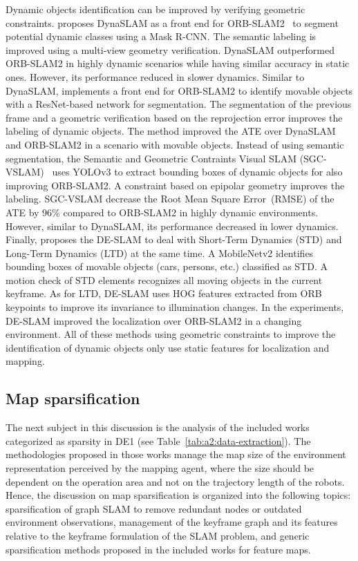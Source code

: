Dynamic objects identification can be improved by verifying geometric constraints.
\cite{bescos-et-al:2018:2860039} proposes DynaSLAM as a front end for ORB-SLAM2~\parencite{discussion:orb-slam2} to segment potential dynamic classes using a Mask R-CNN. The semantic labeling is improved using a multi-view geometry verification. DynaSLAM outperformed ORB-SLAM2 in highly dynamic scenarios while having similar accuracy in static ones. However, its performance reduced in slower dynamics.
Similar to DynaSLAM, \cite{wang-et-al:2019:8793499} implements a front end for ORB-SLAM2 to identify movable objects with a ResNet-based network for segmentation. The segmentation of the previous frame and a geometric verification based on the reprojection error improves the labeling of dynamic objects. The method improved the ATE over DynaSLAM and ORB-SLAM2 in a scenario with movable objects.
Instead of using semantic segmentation, the Semantic and Geometric Contraints Visual SLAM (SGC-VSLAM)~\parencite{yang-et-al:2020:s20082432} uses YOLOv3 to extract bounding boxes of dynamic objects for also improving ORB-SLAM2. A constraint based on epipolar geometry improves the labeling. SGC-VSLAM decrease the Root Mean Square Error~(RMSE) of the ATE by 96\% compared to ORB-SLAM2 in highly dynamic environments. However, similar to DynaSLAM, its performance decreased in lower dynamics.
Finally, \cite{xing-et-al:2022:22062} proposes the DE-SLAM to deal with Short-Term Dynamics (STD) and Long-Term Dynamics (LTD) at the same time. A MobileNetv2 identifies bounding boxes of movable objects (cars, persons, etc.) classified as STD. A motion check of STD elements recognizes all moving objects in the current keyframe. As for LTD, DE-SLAM uses HOG features extracted from ORB keypoints to improve its invariance to illumination changes. In the experiments, DE-SLAM improved the localization over ORB-SLAM2 in a changing environment.
All of these methods using geometric constraints to improve the identification of dynamic objects only use static features for localization and mapping.





\subsection{Map sparsification}
\label{sec:discussion:sparsity}

The next subject in this discussion is the analysis of the included works categorized as sparsity in DE1 (see Table~\ref{tab:a2:data-extraction}). The methodologies proposed in those works manage the map size of the environment representation perceived by the mapping agent, where the size should be dependent on the operation area and not on the trajectory length of the robots.
Hence, the discussion on map sparsification is organized into the following topics: sparsification of graph SLAM to remove redundant nodes or outdated environment observations, management of the keyframe graph and its features relative to the keyframe formulation of the SLAM problem, and generic sparsification methods proposed in the included works for feature maps.



